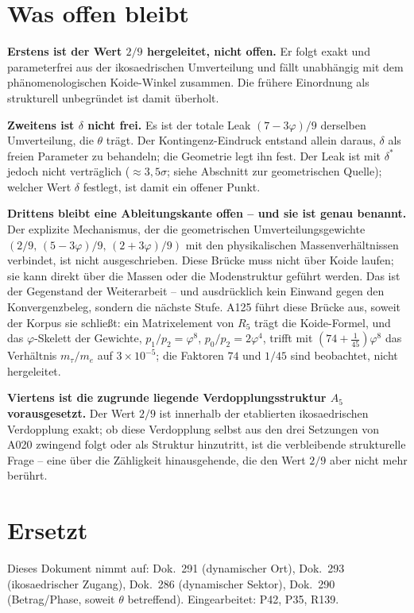 \section{Was offen bleibt}

\textbf{Erstens ist der Wert $2/9$ hergeleitet, nicht offen.} Er folgt exakt und
parameterfrei aus der ikosaedrischen Umverteilung und fällt unabhängig mit dem
phänomenologischen Koide-Winkel zusammen. Die frühere Einordnung als
strukturell unbegründet ist damit überholt.

\textbf{Zweitens ist $\delta$ nicht frei.} Es ist der totale Leak
$(7-3\varphi)/9$ derselben Umverteilung, die $\theta$ trägt. Der
Kontingenz-Eindruck entstand allein daraus, $\delta$ als freien Parameter zu
behandeln; die Geometrie legt ihn fest. Der Leak ist mit $\delta^*$ jedoch nicht verträglich ($\approx3{,}5\sigma$; siehe Abschnitt zur geometrischen Quelle); welcher Wert $\delta$ festlegt, ist damit ein offener Punkt.

\textbf{Drittens bleibt eine Ableitungskante offen -- und sie ist genau benannt.}
Der explizite Mechanismus, der die geometrischen Umverteilungsgewichte
$(2/9,\,(5-3\varphi)/9,\,(2+3\varphi)/9)$ mit den physikalischen
Massenverhältnissen verbindet, ist nicht ausgeschrieben. Diese Brücke muss nicht
über Koide laufen; sie kann direkt über die Massen oder die Modenstruktur
geführt werden. Das ist der Gegenstand der Weiterarbeit -- und ausdrücklich kein
Einwand gegen den Konvergenzbeleg, sondern die nächste Stufe. A125 führt diese Brücke aus, soweit der Korpus sie schließt: ein Matrixelement von $R_5$ trägt die Koide-Formel, und das $\varphi$-Skelett der Gewichte, $p_1/p_2=\varphi^8$, $p_0/p_2=2\varphi^4$, trifft mit $(74+\tfrac1{45})\varphi^8$ das Verhältnis $m_\tau/m_e$ auf $3\times10^{-5}$; die Faktoren $74$ und $1/45$ sind beobachtet, nicht hergeleitet.

\textbf{Viertens ist die zugrunde liegende Verdopplungsstruktur $A_5$
vorausgesetzt.} Der Wert $2/9$ ist innerhalb der etablierten ikosaedrischen
Verdopplung exakt; ob diese Verdopplung selbst aus den drei Setzungen von A020
zwingend folgt oder als Struktur hinzutritt, ist die verbleibende strukturelle
Frage -- eine über die Zähligkeit hinausgehende, die den Wert $2/9$ aber nicht
mehr berührt.

\section{Ersetzt}

Dieses Dokument nimmt auf: Dok.~291 (dynamischer Ort), Dok.~293 (ikosaedrischer
Zugang), Dok.~286 (dynamischer Sektor), Dok.~290 (Betrag/Phase, soweit $\theta$ betreffend). Eingearbeitet: P42, P35, R139.

